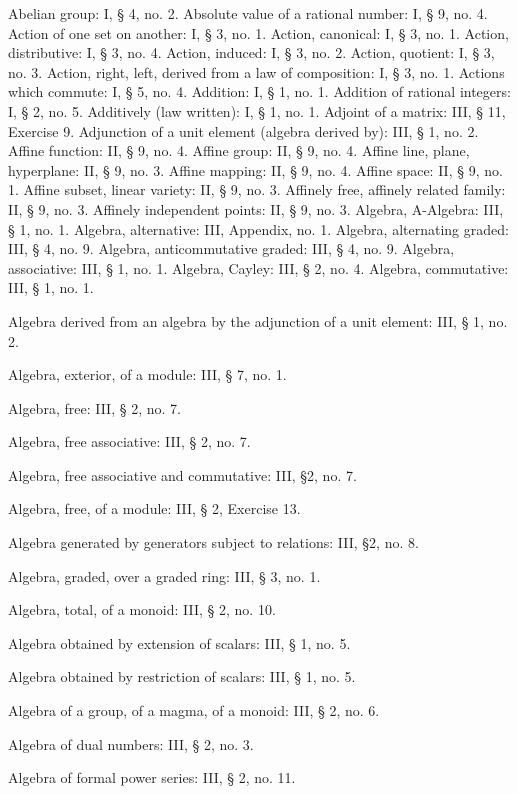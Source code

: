 
Abelian group: I, § 4, no. 2. Absolute value of a rational number: I, § 9, no. 4. Action of one set on another: I, § 3, no. 1. Action, canonical: I, § 3, no. 1. Action, distributive: I, § 3, no. 4. Action, induced: I, § 3, no. 2. Action, quotient: I, § 3, no. 3. Action, right, left, derived from a law of composition: I, § 3, no. 1. Actions which commute: I, § 5, no. 4. Addition: I, § 1, no. 1. Addition of rational integers: I, § 2, no. 5. Additively (law written): I, § 1, no. 1. Adjoint of a matrix: III, § 11, Exercise 9. Adjunction of a unit element (algebra derived by): III, § 1, no. 2. Affine function: II, § 9, no. 4. Affine group: II, § 9, no. 4. Affine line, plane, hyperplane: II, § 9, no. 3. Affine mapping: II, § 9, no. 4. Affine space: II, § 9, no. 1. Affine subset, linear variety: II, § 9, no. 3. Affinely free, affinely related family: II, § 9, no. 3. Affinely independent points: II, § 9, no. 3. Algebra, A-Algebra: III, § 1, no. 1. Algebra, alternative: III, Appendix, no. 1. Algebra, alternating graded: III, § 4, no. 9. Algebra, anticommutative graded: III, § 4, no. 9. Algebra, associative: III, § 1, no. 1. Algebra, Cayley: III, § 2, no. 4. Algebra, commutative: III, § 1, no. 1.

Algebra derived from an algebra by the adjunction of a unit element: III, § 1, no. 2.

Algebra, exterior, of a module: III, § 7, no. 1.

Algebra, free: III, § 2, no. 7.

Algebra, free associative: III, § 2, no. 7.

Algebra, free associative and commutative: III, §2, no. 7.

Algebra, free, of a module: III, § 2, Exercise 13.

Algebra generated by generators subject to relations: III, §2, no. 8.

Algebra, graded, over a graded ring: III, § 3, no. 1.

Algebra, total, of a monoid: III, § 2, no. 10.

Algebra obtained by extension of scalars: III, § 1, no. 5.

Algebra obtained by restriction of scalars: III, § 1, no. 5.

Algebra of a group, of a magma, of a monoid: III, § 2, no. 6.

Algebra of dual numbers: III, § 2, no. 3.

Algebra of formal power series: III, § 2, no. 11.

